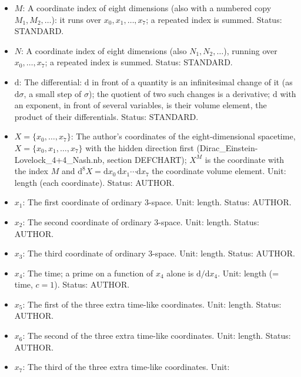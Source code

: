 \documentclass[
  10pt,
]{article}
\begin{document}
\begin{itemize}
  (signature \(+,+,+,+,-,-,-,-\) in the order \(x_0, \dots, x_7\)):
  \(g_{MN}\,\mathrm{d}X^M\mathrm{d}X^N\) is the squared interval,
  \(g^{MN}\) its inverse, \(\lvert g\rvert\) the absolute value of its
  determinant (\(\sqrt{\lvert g\rvert}\,\mathrm{d}^8X\) is the proper
  volume element). Unit: dimensionless. Status: AUTHOR.
\item
  \(M\): A coordinate index of eight dimensions (also with a numbered
  copy \(M_1, M_2, \dots\)): it runs over \(x_0, x_1, \dots, x_7\); a
  repeated index is summed. Status: STANDARD.
\item
  \(N\): A coordinate index of eight dimensions (also
  \(N_1, N_2, \dots\)), running over \(x_0, \dots, x_7\); a repeated
  index is summed. Status: STANDARD.
\item
  \(\mathrm{d}\): The differential: \(\mathrm{d}\) in front of a
  quantity is an infinitesimal change of it (as \(\mathrm{d}\sigma\), a
  small step of \(\sigma\)); the quotient of two such changes is a
  derivative; \(\mathrm{d}\) with an exponent, in front of several
  variables, is their volume element, the product of their
  differentials. Status: STANDARD.
\item
  \(X = \{x_0, \dots, x_7\}\): The author's coordinates of the
  eight-dimensional spacetime, \(X = \{x_0, x_1, \dots, x_7\}\) with the
  hidden direction first (Dirac\_Einstein-Lovelock\_4+4\_Nash.nb,
  section DEFCHART); \(X^M\) is the coordinate with the index \(M\) and
  \(\mathrm{d}^8X = \mathrm{d}x_0\,\mathrm{d}x_1\cdots\mathrm{d}x_7\)
  the coordinate volume element. Unit: length (each coordinate). Status:
  AUTHOR.
\item
  \(x_1\): The first coordinate of ordinary 3-space. Unit: length.
  Status: AUTHOR.
\item
  \(x_2\): The second coordinate of ordinary 3-space. Unit: length.
  Status: AUTHOR.
\item
  \(x_3\): The third coordinate of ordinary 3-space. Unit: length.
  Status: AUTHOR.
\item
  \(x_4\): The time; a prime on a function of \(x_4\) alone is
  \(\mathrm{d}/\mathrm{d}x_4\). Unit: length (= time, \(c = 1\)).
  Status: AUTHOR.
\item
  \(x_5\): The first of the three extra time-like coordinates. Unit:
  length. Status: AUTHOR.
\item
  \(x_6\): The second of the three extra time-like coordinates. Unit:
  length. Status: AUTHOR.
\item
  \(x_7\): The third of the three extra time-like coordinates. Unit:

\end{itemize}
\end{document}
